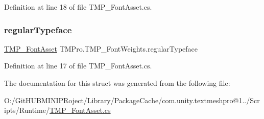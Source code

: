 Definition at line 18 of file T\+M\+P\+\_\+\+Font\+Asset.\+cs.

\mbox{\label{struct_t_m_pro_1_1_t_m_p___font_weights_a326cf47ef4e92236a30c074002999d52}} 
\subsubsection{\texorpdfstring{regularTypeface}{regularTypeface}}
{\footnotesize\ttfamily \mbox{\hyperlink{class_t_m_pro_1_1_t_m_p___font_asset}{T\+M\+P\+\_\+\+Font\+Asset}} T\+M\+Pro.\+T\+M\+P\+\_\+\+Font\+Weights.\+regular\+Typeface}



Definition at line 17 of file T\+M\+P\+\_\+\+Font\+Asset.\+cs.



The documentation for this struct was generated from the following file\+:\begin{DoxyCompactItemize}
\item 
O\+:/\+Git\+H\+U\+B\+M\+I\+N\+I\+P\+Roject/\+Library/\+Package\+Cache/com.\+unity.\+textmeshpro@1../\+Scripts/\+Runtime/\mbox{\hyperlink{_t_m_p___font_asset_8cs}{T\+M\+P\+\_\+\+Font\+Asset.\+cs}}\end{DoxyCompactItemize}
